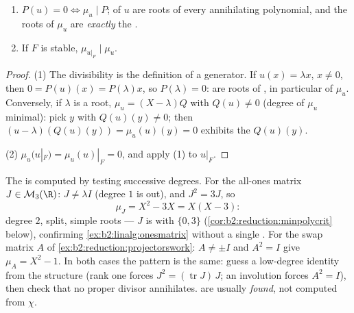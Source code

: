 \begin{proposition}\label{prop:b2:reduction:minpoly}
\begin{enumerate}
  \item $P(u) = 0 \iff \mu_u \mid P$;  of $u$ are roots
        of every annihilating polynomial, and the roots of $\mu_u$
        are \emph{exactly} the .
  \item If $F$ is stable, $\mu_{u|_F} \mid \mu_u$.
\end{enumerate}
\end{proposition}

\begin{proof}
(1) The divisibility is the definition of a generator. If $u(x) =
\lambda x$, $x \neq 0$, then $0 = P(u)(x) = P(\lambda)x$, so
$P(\lambda) = 0$:  are roots of , in
particular of $\mu_u$. Conversely, if $\lambda$ is a root, $\mu_u =
(X - \lambda)Q$ with $Q(u) \neq 0$ (degree of $\mu_u$ minimal): pick
$y$ with $Q(u)(y) \neq 0$; then $(u - \lambda)(Q(u)(y)) = \mu_u(u)(y)
= 0$ exhibits the  $Q(u)(y)$.

(2) $\mu_u(u|_F) = \mu_u(u)|_F = 0$, and apply (1) to $u|_F$.
\end{proof}

\begin{example}\label{ex:b2:reduction:minpolyhand}
The  is computed by testing successive
degrees. For the all-ones matrix $J \in \mathcal{M}_3(\R)$:
$J \neq \lambda I$ (degree $1$ is out), and $J^2 = 3J$, so
\[
\mu_J = X^2 - 3X = X(X - 3) :
\]
degree $2$, split, simple roots --- $J$ is  with
 $\{0, 3\}$ (\cref{cor:b2:reduction:minpolycrit} below),
confirming \cref{ex:b2:linalg:onesmatrix} without a single
. For the swap matrix $A$ of
\cref{ex:b2:reduction:projectorswork}: $A \neq \pm I$ and $A^2
= I$ give $\mu_A = X^2 - 1$. In both cases the pattern is the
same: guess a low-degree identity from the structure
(rank one forces $J^2 = (\operatorname{tr}J)\,J$; an involution
forces $A^2 = I$), then check that no proper divisor
annihilates.  are usually \emph{found}, not
computed from $\chi$.
\end{example}

